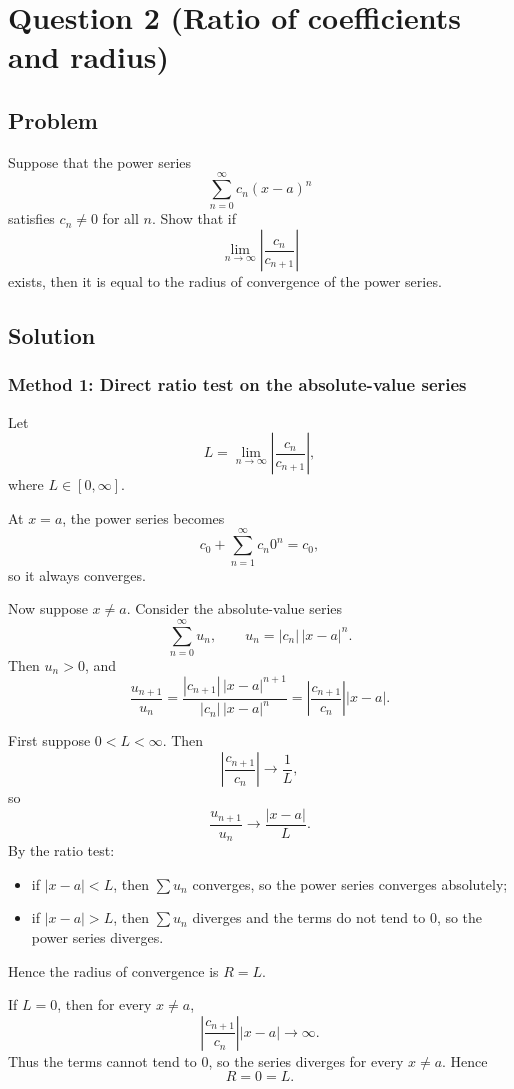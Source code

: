 \documentclass[12pt]{article}
\begin{document}
\newpage
\section*{Question 2 (Ratio of coefficients and radius)}
\subsection*{Problem}
Suppose that the power series
\[
\sum_{n=0}^{\infty}c_n(x-a)^n
\]
satisfies \(c_n\neq0\) for all \(n\). Show that if
\[
\lim_{n\to\infty}\left|\frac{c_n}{c_{n+1}}\right|
\]
exists, then it is equal to the radius of convergence of the power series.

\subsection*{Solution}

\subsubsection*{Method 1: Direct ratio test on the absolute-value series}
Let
\[
L=\lim_{n\to\infty}\left|\frac{c_n}{c_{n+1}}\right|,
\]
where \(L\in[0,\infty]\).

At \(x=a\), the power series becomes
\[
c_0+\sum_{n=1}^{\infty}c_n0^n=c_0,
\]
so it always converges.

Now suppose \(x\ne a\). Consider the absolute-value series
\[
\sum_{n=0}^{\infty}u_n,
\qquad
u_n=|c_n|\,|x-a|^n.
\]
Then \(u_n>0\), and
\[
\frac{u_{n+1}}{u_n}
=
\frac{|c_{n+1}|\,|x-a|^{n+1}}{|c_n|\,|x-a|^n}
=
\left|\frac{c_{n+1}}{c_n}\right||x-a|.
\]

First suppose \(0<L<\infty\). Then
\[
\left|\frac{c_{n+1}}{c_n}\right|\to\frac1L,
\]
so
\[
\frac{u_{n+1}}{u_n}
\to
\frac{|x-a|}{L}.
\]
By the ratio test:
\begin{itemize}[leftmargin=*]
\item if \(|x-a|<L\), then \(\sum u_n\) converges, so the power series converges absolutely;
\item if \(|x-a|>L\), then \(\sum u_n\) diverges and the terms do not tend to \(0\), so the power series diverges.
\end{itemize}
Hence the radius of convergence is \(R=L\).

If \(L=0\), then for every \(x\ne a\),
\[
\left|\frac{c_{n+1}}{c_n}\right||x-a|\to\infty.
\]
Thus the terms cannot tend to \(0\), so the series diverges for every \(x\ne a\). Hence
\[
R=0=L.
\]
\end{document}
